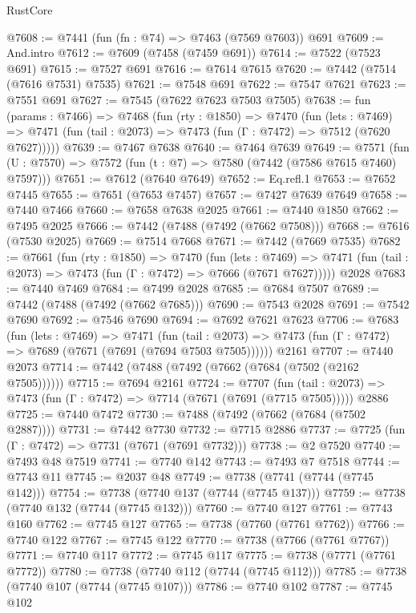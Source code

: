 \begin{lexlean}{RustCore}
\begin{coremodule}
@7608 := @7441 (fun (fn : @74) => @7463 (@7569 @7603)) @691
@7609 := And.intro
@7612 := @7609 (@7458 (@7459 @691))
@7614 := @7522 (@7523 @691)
@7615 := @7527 @691
@7616 := @7614 @7615
@7620 := @7442 (@7514 (@7616 @7531) @7535)
@7621 := @7548 @691
@7622 := @7547 @7621
@7623 := @7551 @691
@7627 := @7545 (@7622 @7623 @7503 @7505)
@7638 := fun (params : @7466) =>
  @7468
    (fun (rty : @1850) =>
    @7470
      (fun (lets : @7469) =>
      @7471 (fun (tail : @2073) => @7473 (fun (Γ : @7472) => @7512 (@7620 @7627)))))
@7639 := @7467 @7638
@7640 := @7464 @7639
@7649 := @7571 (fun (U : @7570) => @7572 (fun (t : @7) => @7580 (@7442 (@7586 @7615 @7460) @7597)))
@7651 := @7612 (@7640 @7649)
@7652 := Eq.refl.{1}
@7653 := @7652 @7445
@7655 := @7651 (@7653 @7457)
@7657 := @7427 @7639 @7649
@7658 := @7440 @7466
@7660 := @7658 @7638 @2025
@7661 := @7440 @1850
@7662 := @7495 @2025
@7666 := @7442 (@7488 (@7492 (@7662 @7508)))
@7668 := @7616 (@7530 @2025)
@7669 := @7514 @7668
@7671 := @7442 (@7669 @7535)
@7682 := @7661
    (fun (rty : @1850) =>
    @7470
      (fun (lets : @7469) =>
      @7471 (fun (tail : @2073) => @7473 (fun (Γ : @7472) => @7666 (@7671 @7627)))))
    @2028
@7683 := @7440 @7469
@7684 := @7499 @2028
@7685 := @7684 @7507
@7689 := @7442 (@7488 (@7492 (@7662 @7685)))
@7690 := @7543 @2028
@7691 := @7542 @7690
@7692 := @7546 @7690
@7694 := @7692 @7621 @7623
@7706 := @7683
    (fun (lets : @7469) =>
    @7471
      (fun (tail : @2073) => @7473 (fun (Γ : @7472) => @7689 (@7671 (@7691 (@7694 @7503 @7505))))))
    @2161
@7707 := @7440 @2073
@7714 := @7442 (@7488 (@7492 (@7662 (@7684 (@7502 (@2162 @7505))))))
@7715 := @7694 @2161
@7724 := @7707
    (fun (tail : @2073) => @7473 (fun (Γ : @7472) => @7714 (@7671 (@7691 (@7715 @7505)))))
    @2886
@7725 := @7440 @7472
@7730 := @7488 (@7492 (@7662 (@7684 (@7502 @2887))))
@7731 := @7442 @7730
@7732 := @7715 @2886
@7737 := @7725 (fun (Γ : @7472) => @7731 (@7671 (@7691 @7732)))
@7738 := @2 @7520
@7740 := @7493 @48 @7519
@7741 := @7740 @142
@7743 := @7493 @7 @7518
@7744 := @7743 @11
@7745 := @2037 @48
@7749 := @7738 (@7741 (@7744 (@7745 @142)))
@7754 := @7738 (@7740 @137 (@7744 (@7745 @137)))
@7759 := @7738 (@7740 @132 (@7744 (@7745 @132)))
@7760 := @7740 @127
@7761 := @7743 @160
@7762 := @7745 @127
@7765 := @7738 (@7760 (@7761 @7762))
@7766 := @7740 @122
@7767 := @7745 @122
@7770 := @7738 (@7766 (@7761 @7767))
@7771 := @7740 @117
@7772 := @7745 @117
@7775 := @7738 (@7771 (@7761 @7772))
@7780 := @7738 (@7740 @112 (@7744 (@7745 @112)))
@7785 := @7738 (@7740 @107 (@7744 (@7745 @107)))
@7786 := @7740 @102
@7787 := @7745 @102

\end{coremodule}
\end{lexlean}
